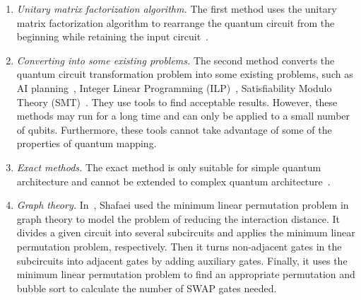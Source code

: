 \documentclass[runningheads]{llncs}
\begin{document}
\begin{enumerate}[1)]
	\item \emph{Unitary matrix factorization algorithm.} The first method uses the unitary matrix factorization algorithm to rearrange the quantum circuit from the beginning while retaining the input circuit~\cite{2019CNOT,2019Quantum}.
	\item \emph{Converting into some existing problems.} The second method converts the quantum circuit transformation problem into some existing problems, such as AI planning~\cite{2017Temporal,2018Integer}, Integer Linear Programming (ILP)~\cite{2019Almeida}, Satisfiability Modulo Theory (SMT)~\cite{2019Murali}. They use tools to find acceptable results. However, these methods may run for a long time and can only be applied to a small number of qubits. Furthermore, these tools cannot take advantage of some of the properties of quantum mapping.
	\item \emph{Exact methods.} 
	The exact method is only suitable for simple quantum architecture and cannot be extended to complex quantum architecture~\cite{2018QubitSiraichi}.
	\item \emph{Graph theory.} 
	In~\cite{Shafaei2013}, Shafaei used the minimum linear permutation problem in graph theory to model the problem of reducing the interaction distance. It divides a given circuit into several subcircuits and applies the minimum linear permutation problem, respectively. Then it turns non-adjacent gates in the subcircuits into adjacent gates by adding auxiliary gates. Finally, it uses the minimum linear permutation problem to find an appropriate permutation and bubble sort to calculate the number of SWAP gates needed.
   

\end{enumerate}
\end{document}
